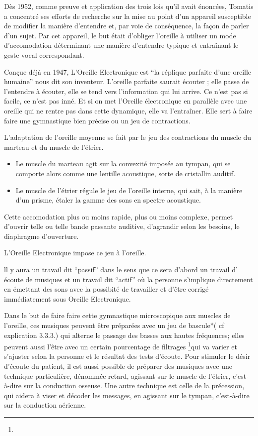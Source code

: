 Dès 1952, comme preuve et application des trois lois qu'il avait énoncées,
Tomatis a concentré ses efforts de recherche sur la mise au point
d'un appareil susceptible de modifier la manière d'entendre et, par
voie de conséquence, la façon de parler d'un sujet. Par cet appareil,
le but était d'obliger l'oreille à utiliser un mode d'accomodation
déterminant une manière d'entendre typique et entraînant le geste
vocal correspondant.

Conçue déjà en 1947, L'Oreille Electronique est ``la réplique parfaite
d'une oreille humaine'' nous dit son inventeur. L'oreille parfaite
saurait écouter ; elle passe de l'entendre à écouter, elle se tend
vers l'information qui lui arrive. Ce n'est pas si facile, ce n'est
pas inné. Et si on met l'Oreille électronique en parallèle avec une
oreille qui ne rentre pas dans cette dynamique, elle va l'entraîner.
Elle sert à faire faire une gymnastique bien précise ou un jeu de
contractions.

L'adaptation de l'oreille moyenne se fait par le jeu des contractions
du muscle du marteau et du muscle de l'étrier.
\begin{itemize}
\item Le muscle du marteau agit sur la convexité imposée au tympan, qui
se comporte alors comme une lentille acoustique, sorte de cristallin
auditif.
\item Le muscle de l'étrier régule le jeu de l'oreille interne, qui sait,
à la manière d'un prisme, étaler la gamme des sons en spectre acoustique.
\end{itemize}
Cette accomodation plus ou moins rapide, plus ou moins complexe, permet
d'ouvrir telle ou telle bande passante auditive, d'agrandir selon
les besoins, le diaphragme d'ouverture.

L'Oreille Electronique impose ce jeu à l'oreille.

ll y aura un travail dit ``passif'' dans le sens que ce sera d'abord
un travail d' écoute de musiques et un travail dit ``actif'' où
la personne s'implique directement en émettant des sons avec la possibité
de travailler et d'être corrigé immédiatement sous Oreille Electronique.

Dans le but de faire faire cette gymnastique microscopique aux muscles
de l'oreille, ces musiques peuvent être préparées avec un jeu de bascule{*}(
cf explication 3.3.3.) qui alterne le passage des basses aux hautes
fréquences; elles peuvent aussi l'être avec un certain pourcentage
de filtrages \footnote{}qui va varier et s'ajuster selon la personne
et le résultat des tests d'écoute. Pour stimuler le désir d'écoute
du patient, il est aussi possible de préparer des musiques avec une
technique particulière, dénommée retard, agissant sur le muscle de
l'étrier, c'est-à-dire sur la conduction osseuse. Une autre technique
est celle de la précession, qui aidera à viser et décoder les messages,
en agissant sur le tympan, c'est-à-dire sur la conduction aérienne. 

